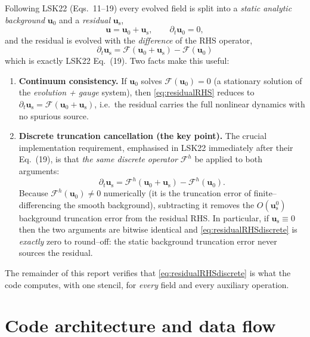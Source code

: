 \documentclass[11pt]{article}
\newcommand{\bg}[1]{#1_{0}}
\newcommand{\res}[1]{#1_{\mathrm s}}
\newcommand{\Fop}{\mathcal{F}}            %
\newcommand{\Fnum}{\Fop^{h}}              %
\begin{document}
Following LSK22 (Eqs.~11--19) every evolved field is split into a
\emph{static analytic background} $\bg{\bm u}$ and a \emph{residual}
$\res{\bm u}$,
\begin{equation}
  \bm u = \bg{\bm u} + \res{\bm u}, \qquad \partial_t \bg{\bm u}=0,
  \label{eq:split}
\end{equation}
and the residual is evolved with the \emph{difference} of the RHS operator,
\begin{equation}
  \boxed{\ \partial_t \res{\bm u}
     = \Fop(\bg{\bm u}+\res{\bm u}) - \Fop(\bg{\bm u})\ }
  \label{eq:residualRHS}
\end{equation}
which is exactly LSK22 Eq.~(19). Two facts make this useful:
\begin{enumerate}[leftmargin=1.6em,itemsep=2pt]
\item \textbf{Continuum consistency.} If $\bg{\bm u}$ solves
$\Fop(\bg{\bm u})=0$ (a stationary solution of the \emph{evolution + gauge}
system), then \eqref{eq:residualRHS} reduces to $\partial_t\res{\bm
u}=\Fop(\bg{\bm u}+\res{\bm u})$, i.e.\ the residual carries the full nonlinear
dynamics with no spurious source.
\item \textbf{Discrete truncation cancellation (the key point).} The crucial
implementation requirement, emphasised in LSK22 immediately after their
Eq.~(19), is that \emph{the same discrete operator} $\Fnum$ be applied to both
arguments:
\begin{equation}
  \partial_t \res{\bm u}
     = \Fnum(\bg{\bm u}+\res{\bm u}) - \Fnum(\bg{\bm u}).
  \label{eq:residualRHSdiscrete}
\end{equation}
Because $\Fnum(\bg{\bm u})\neq 0$ numerically (it is the truncation error of
finite--differencing the smooth background), subtracting it removes the
$O(\res{\bm u}^0)$ background truncation error from the residual RHS. In
particular, if $\res{\bm u}\equiv 0$ then the two arguments are bitwise
identical and \eqref{eq:residualRHSdiscrete} is \emph{exactly} zero to
round--off: the static background truncation error never sources the residual.
\end{enumerate}

The remainder of this report verifies that \eqref{eq:residualRHSdiscrete} is
what the code computes, with one stencil, for \emph{every} field and every
auxiliary operation.

\section{Code architecture and data flow}
\end{document}

